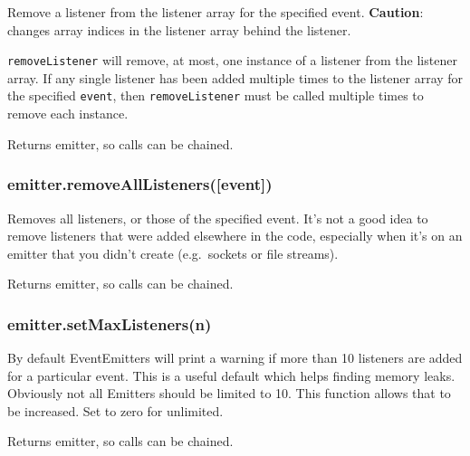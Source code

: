 Remove a listener from the listener array for the specified event.
\textbf{Caution}: changes array indices in the listener array behind the
listener.

\begin{Shaded}
\begin{Highlighting}[]
 
  \NormalTok{(}\NormalTok{);}
\NormalTok{\};}
\NormalTok{(}
\NormalTok{(}
\end{Highlighting}
\end{Shaded}

\texttt{removeListener} will remove, at most, one instance of a listener
from the listener array. If any single listener has been added multiple
times to the listener array for the specified \texttt{event}, then
\texttt{removeListener} must be called multiple times to remove each
instance.

Returns emitter, so calls can be chained.

\subsubsection{emitter.removeAllListeners({[}event{]})}\label{emitter.removealllistenersevent}

Removes all listeners, or those of the specified event. It's not a good
idea to remove listeners that were added elsewhere in the code,
especially when it's on an emitter that you didn't create (e.g.~sockets
or file streams).

Returns emitter, so calls can be chained.

\subsubsection{emitter.setMaxListeners(n)}\label{emitter.setmaxlistenersn}

By default EventEmitters will print a warning if more than 10 listeners
are added for a particular event. This is a useful default which helps
finding memory leaks. Obviously not all Emitters should be limited to
10. This function allows that to be increased. Set to zero for
unlimited.

Returns emitter, so calls can be chained.

